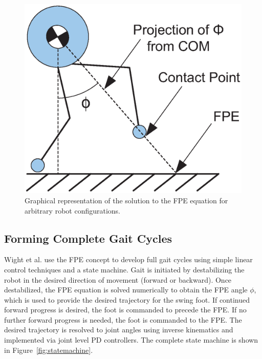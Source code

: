 \begin{figure}[b]
	\centering
    \includegraphics[scale=0.6]{fig/ch4/fpeangle.eps}
  	\caption{Graphical representation of the solution to the FPE equation for arbitrary robot configurations.}
	\label{fig:fpeangle}
\end{figure}


\subsection{Forming Complete Gait Cycles} %
\label{sub:gait_cycles}
Wight et al. \cite{Wight:2008ii} use the FPE concept to develop full gait cycles using simple linear control techniques and a state machine. Gait is initiated by destabilizing the robot in the desired direction of movement (forward or backward). Once destabilized, the FPE equation is solved numerically to obtain the FPE angle $\phi$, which is used to provide the desired trajectory for the swing foot.  If continued forward progress is desired, the foot is commanded to precede the FPE. If no further forward progress is needed, the foot is commanded to the FPE. The desired trajectory is resolved to joint angles using inverse kinematics and implemented via joint level PD controllers. The complete state machine is shown in Figure~\ref{fig:statemachine}.

